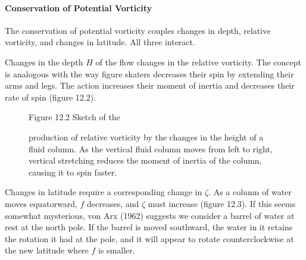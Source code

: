 \paragraph{Conservation of Potential Vorticity}
The conservation of
potential vorticity couples changes in depth, relative vorticity, and
changes in latitude. All three interact.
\begin{enumerate}
\vitem Changes in the depth $H$ of the flow changes in the relative
vorticity. The concept is analogous with the way figure skaters
decreases their spin by extending their arms and legs. The action
increases their moment of inertia and decreases their rate of spin
(figure 12.2).
\begin{figure}[h!]
\footnotesize
Figure 12.2 Sketch of the \rule{0pt}{4ex}production of relative
vorticity by the changes in the height of a fluid column. As the
vertical fluid column moves from left to right, vertical stretching
reduces the moment of inertia of the column, causing it to spin
faster.
\label{fig:spinsketch}
\vspace{-2ex}
\end{figure}
\vitem Changes in latitude require a corresponding change in
$\zeta$. As a column of water moves equatorward, $f$ decreases, and
$\zeta$ must increase (figure 12.3). If this seems somewhat
mysterious, von Arx (1962) suggests we consider a barrel of water at
rest at the north pole. If the barrel is moved southward, the water in
it retains the rotation it had at the pole, and it will appear to
rotate counterclockwise at the new latitude where $f$ is smaller.
\end{enumerate}
